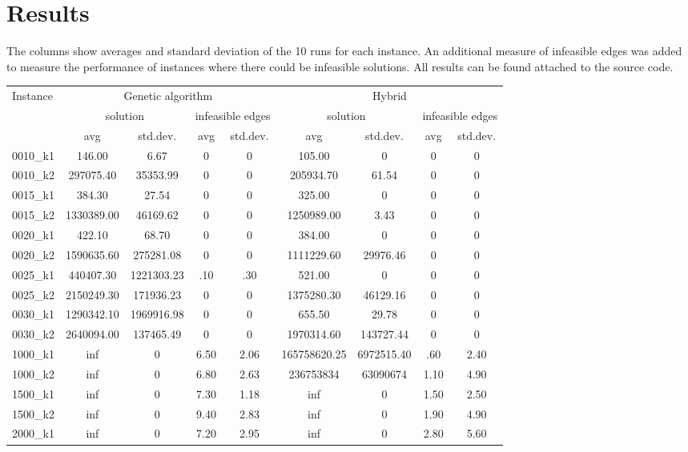 \documentclass{article}
\begin{document}
\section*{Results}
The columns show averages and standard deviation of the 10 runs for each instance. An additional measure of infeasible edges was added to measure the performance of instances where there could be infeasible solutions. All results can be found attached to the source code.
\small
\begin{center}
\begin{tabular}{|l|c|c|c|c|c|c|c|c|}
\hline
\multirow{3}{*}{Instance}& \multicolumn{4}{c}{Genetic algorithm} & \multicolumn{4}{c}{Hybrid} \\
& \multicolumn{2}{c}{solution} & \multicolumn{2}{c}{infeasible edges} & \multicolumn{2}{c}{solution} & \multicolumn{2}{c}{infeasible edges} \\
& avg & std.dev. & avg & std.dev. & avg & std.dev. & avg & std.dev. \\
\hline
0010\_k1 & 146.00 & 6.67 & 0 & 0 & 105.00 & 0 & 0 & 0\\
0010\_k2 & 297075.40 & 35353.99 & 0 & 0 & 205934.70 & 61.54 & 0 & 0\\
0015\_k1 & 384.30 & 27.54 & 0 & 0 & 325.00 & 0 & 0 & 0\\
0015\_k2 & 1330389.00 & 46169.62 & 0 & 0 & 1250989.00 & 3.43 & 0 & 0\\
0020\_k1 & 422.10 & 68.70 & 0 & 0 & 384.00 & 0 & 0 & 0\\
0020\_k2 & 1590635.60 & 275281.08 & 0 & 0 & 1111229.60 & 29976.46 & 0 & 0\\
0025\_k1 & 440407.30 & 1221303.23 & .10 & .30 & 521.00 & 0 & 0 & 0\\
0025\_k2 & 2150249.30 & 171936.23 & 0 & 0 & 1375280.30 & 46129.16 & 0 & 0\\
0030\_k1 & 1290342.10 & 1969916.98 & 0 & 0 & 655.50 & 29.78 & 0 & 0\\
0030\_k2 & 2640094.00 & 137465.49 & 0 & 0 & 1970314.60 & 143727.44 & 0 & 0\\
1000\_k1 & inf & 0 & 6.50 & 2.06 & 165758620.25 & 6972515.40 & .60 & 2.40\\
1000\_k2 & inf & 0 & 6.80 & 2.63 & 236753834 & 63090674 & 1.10 & 4.90\\
1500\_k1 & inf & 0 & 7.30 & 1.18 & inf & 0 & 1.50 & 2.50\\
1500\_k2 & inf & 0 & 9.40 & 2.83 & inf & 0 & 1.90 & 4.90\\
2000\_k1 & inf & 0 & 7.20 & 2.95 & inf & 0 & 2.80 & 5.60\\

\end{tabular}
\end{center}
\end{document}
